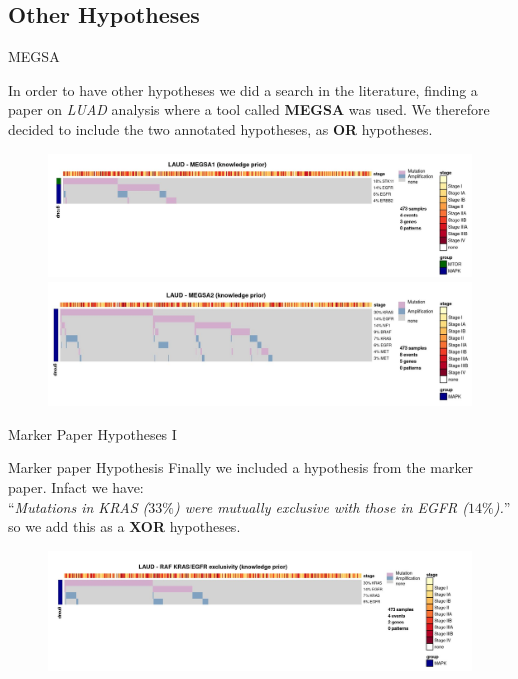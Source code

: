 \documentclass{beamer}
\begin{document}
\subsection{Other Hypotheses}
\begin{frame}{MEGSA}
  \begin{block}{}
    In order to have other hypotheses we did a search in the literature, finding
    a paper \cite{megsaluad} on \textit{LUAD} analysis where a tool called
    \textbf{MEGSA} \cite{megsa} was used. We therefore decided to include the
    two annotated hypotheses, as \textbf{OR} hypotheses.  
  \end{block}
  \begin{figure}
    \centering
    \includegraphics[scale = 0.15]{img/megsa1.jpg}
    \includegraphics[scale = 0.15]{img/megsa2.jpg}  
  \end{figure}
\end{frame}
\begin{frame}{Marker Paper Hypotheses I}
  \begin{block}{Marker paper Hypothesis}
    Finally we included a hypothesis from the marker paper. Infact we have:\\
    ``\textit{Mutations in KRAS ($33\%$) were mutually exclusive with those in
      EGFR ($14\%$).}'' so we add this as a \textbf{XOR} hypotheses.
  \end{block}
  \begin{figure}
    \centering
    \includegraphics[scale = 0.18]{img/oncoprior.jpg}  
  \end{figure}
\end{frame}
\end{document}
